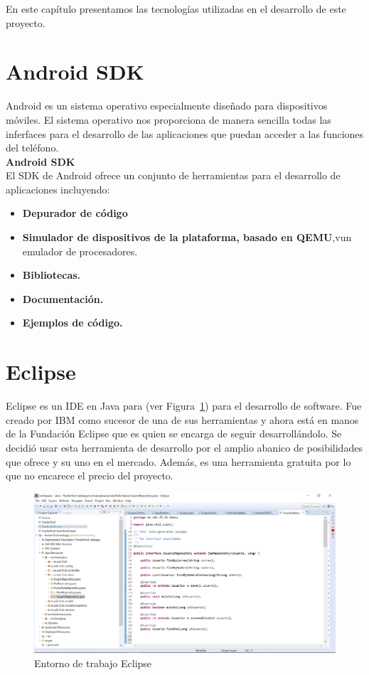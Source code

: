 En este capítulo presentamos las tecnologías utilizadas en el desarrollo de este proyecto. 

\section{Android SDK}
Android  \cite{2}  \cite{3} es un sistema operativo especialmente diseñado para dispositivos móviles. El sistema operativo nos proporciona de manera sencilla todas las inferfaces para el desarrollo de las aplicaciones que puedan acceder a las funciones del teléfono.\\

\textbf{Android SDK}\\

El SDK de Android ofrece un conjunto de herramientas para el desarrollo de aplicaciones incluyendo:
\begin{itemize}
\item \textbf{Depurador de código}
\item \textbf{Simulador de dispositivos de la plataforma, basado en QEMU},vun emulador de procesadores. 
\item\textbf{ Bibliotecas.}
\item \textbf{Documentación.}
\item \textbf{Ejemplos de código.}

\end{itemize}


\section{Eclipse }


Eclipse es un IDE en Java para
(ver Figura~\ref{fig:eclipse}) para el desarrollo de software. Fue creado por IBM como sucesor de una de sus herramientas y ahora está en manos de la Fundación Eclipse que es quien se encarga de seguir desarrollándolo.
Se decidió usar esta herramienta de desarrollo por el amplio abanico de posibilidades que ofrece y su uno en el mercado. Además, es una herramienta gratuita por lo que no encarece el precio del proyecto.  
\begin{figure}[H]
		\centering
		\includegraphics[width=\textwidth] {eclipse.png}
		\caption{Entorno de trabajo Eclipse }
		\label{fig:eclipse}
	\end{figure}
	

